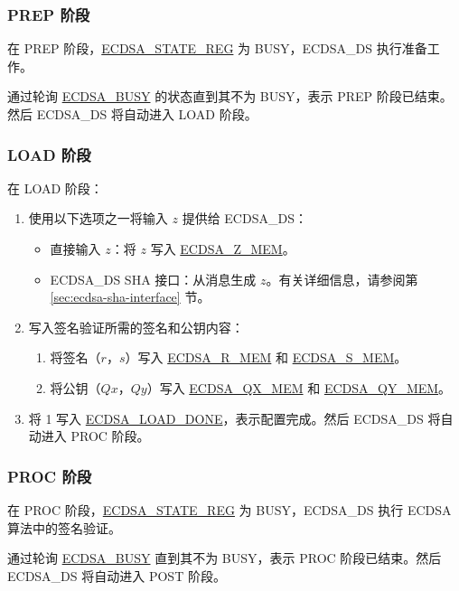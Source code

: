 \documentclass[main\_\_CN.tex]{subfiles}
\begin{document}
\subsubsection{PREP 阶段}

在 PREP 阶段，\hyperref[regdesc:ECDSASTATEREG]{ECDSA\_STATE\_REG} 为 BUSY，ECDSA\_DS 执行准备工作。

通过轮询 \hyperref[fielddesc:ECDSABUSY]{ECDSA\_BUSY} 的状态直到其不为 BUSY，表示 PREP 阶段已结束。然后 ECDSA\_DS 将自动进入 LOAD 阶段。

\subsubsection{LOAD 阶段}
在 LOAD 阶段：

\begin{enumerate}
	\item 使用以下选项之一将输入 $z$ 提供给 ECDSA\_DS：
	      \begin{itemize}
		      \item 直接输入 $z$：将 $z$ 写入 \hyperref[tab:ecdsa-memory]{ECDSA\_Z\_MEM}。
		      \item ECDSA\_DS SHA 接口：从消息生成 $z$。有关详细信息，请参阅第 \ref{sec:ecdsa-sha-interface} 节。
	      \end{itemize}
		      \item 写入签名验证所需的签名和公钥内容：
		            \begin{enumerate}
			            \item 将签名（$r$，$s$）写入 \hyperref[tab:ecdsa-memory]{ECDSA\_R\_MEM} 和 \hyperref[tab:ecdsa-memory]{ECDSA\_S\_MEM}。
			            \item 将公钥（$Qx$，$Qy$）写入 \hyperref[tab:ecdsa-memory]{ECDSA\_QX\_MEM} 和 \hyperref[tab:ecdsa-memory]{ECDSA\_QY\_MEM}。
		            \end{enumerate}
	\item 将 1 写入 \hyperref[fielddesc:ECDSALOADDONE]{ECDSA\_LOAD\_DONE}，表示配置完成。然后 ECDSA\_DS 将自动进入 PROC 阶段。
\end{enumerate}

\subsubsection{PROC 阶段}

在 PROC 阶段，\hyperref[regdesc:ECDSASTATEREG]{ECDSA\_STATE\_REG} 为 BUSY，ECDSA\_DS 执行 ECDSA 算法中的签名验证。

通过轮询 \hyperref[fielddesc:ECDSABUSY]{ECDSA\_BUSY} 直到其不为 BUSY，表示 PROC 阶段已结束。然后 ECDSA\_DS 将自动进入 POST 阶段。
\end{document}
